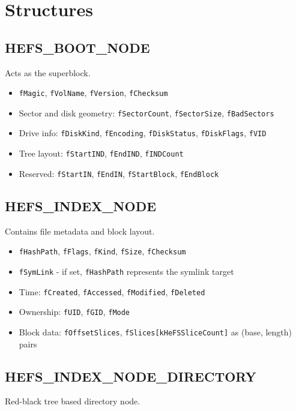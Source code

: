 \documentclass{article}
\begin{document}
\section{Structures}

\subsection{HEFS\_BOOT\_NODE}
Acts as the superblock.

\begin{itemize}
  \item \texttt{fMagic}, \texttt{fVolName}, \texttt{fVersion}, \texttt{fChecksum}
  \item Sector and disk geometry: \texttt{fSectorCount}, \texttt{fSectorSize}, \texttt{fBadSectors}
  \item Drive info: \texttt{fDiskKind}, \texttt{fEncoding}, \texttt{fDiskStatus}, \texttt{fDiskFlags}, \texttt{fVID}
  \item Tree layout: \texttt{fStartIND}, \texttt{fEndIND}, \texttt{fINDCount}
  \item Reserved: \texttt{fStartIN}, \texttt{fEndIN}, \texttt{fStartBlock}, \texttt{fEndBlock}
\end{itemize}

\subsection{HEFS\_INDEX\_NODE}
Contains file metadata and block layout.

\begin{itemize}
  \item \texttt{fHashPath}, \texttt{fFlags}, \texttt{fKind}, \texttt{fSize}, \texttt{fChecksum}
  \item \texttt{fSymLink} - if set, \texttt{fHashPath} represents the symlink target
  \item Time: \texttt{fCreated}, \texttt{fAccessed}, \texttt{fModified}, \texttt{fDeleted}
  \item Ownership: \texttt{fUID}, \texttt{fGID}, \texttt{fMode}
  \item Block data: \texttt{fOffsetSlices}, \texttt{fSlices[kHeFSSliceCount]} as (base, length) pairs
\end{itemize}

\subsection{HEFS\_INDEX\_NODE\_DIRECTORY}
Red-black tree based directory node.
\end{document}
